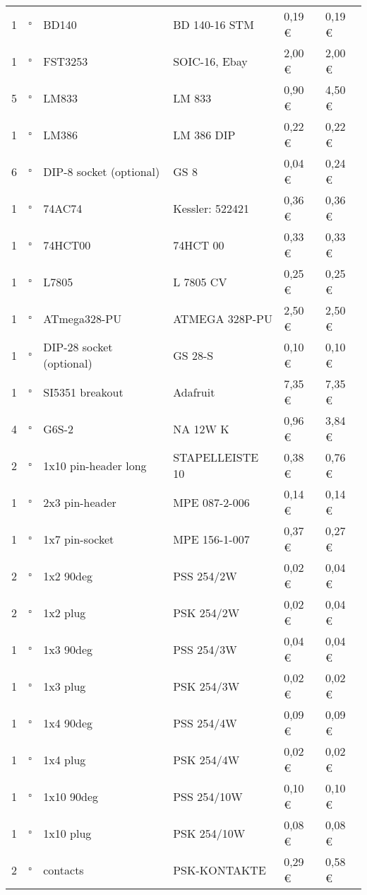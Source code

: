 \begin{longtable}{|p{}|p{}|p{}|p{}|p{}|p{}|}
1 & $\square$ & BD140 & BD 140-16 STM & 0,19 \euro & 0,19 \euro \\
1 & $\square$ & FST3253 & SOIC-16, Ebay & 2,00 \euro & 2,00 \euro \\
5 & $\square$ & LM833 & LM 833 & 0,90 \euro & 4,50 \euro \\
1 & $\square$ & LM386 & LM 386 DIP & 0,22 \euro & 0,22 \euro \\
6 & $\square$ & DIP-8 socket (optional) & GS 8 & 0,04 \euro & 0,24 \euro \\
1 & $\square$ & 74AC74 & Kessler: 522421 & 0,36 \euro & 0,36 \euro \\
1 & $\square$ & 74HCT00 & 74HCT 00 & 0,33 \euro & 0,33 \euro \\
1 & $\square$ & L7805 & L 7805 CV & 0,25 \euro & 0,25 \euro \\
1 & $\square$ & ATmega328-PU & ATMEGA 328P-PU & 2,50 \euro & 2,50 \euro \\
1 & $\square$ & DIP-28 socket (optional) & GS 28-S & 0,10 \euro & 0,10 \euro \\
1 & $\square$ & SI5351 breakout & Adafruit & 7,35 \euro & 7,35 \euro \\ \hline
4 & $\square$ & G6S-2 & NA 12W K & 0,96 \euro & 3,84 \euro \\ \hline
2 & $\square$ & 1x10 pin-header long & STAPELLEISTE 10 & 0,38 \euro & 0,76 \euro \\
1 & $\square$ & 2x3 pin-header & MPE 087-2-006 & 0,14 \euro & 0,14 \euro \\
1 & $\square$ & 1x7 pin-socket & MPE 156-1-007 & 0,37 \euro & 0,27 \euro \\
2 & $\square$ & 1x2 90deg & PSS 254/2W & 0,02 \euro & 0,04 \euro \\
2 & $\square$ & 1x2 plug & PSK 254/2W & 0,02 \euro & 0,04 \euro \\
1 & $\square$ & 1x3 90deg & PSS 254/3W & 0,04 \euro & 0,04 \euro \\
1 & $\square$ & 1x3 plug & PSK 254/3W & 0,02 \euro & 0,02 \euro \\
1 & $\square$ & 1x4 90deg & PSS 254/4W & 0,09 \euro & 0,09 \euro \\
1 & $\square$ & 1x4 plug & PSK 254/4W & 0,02 \euro & 0,02 \euro \\
1 & $\square$ & 1x10 90deg & PSS 254/10W & 0,10 \euro & 0,10 \euro \\
1 & $\square$ & 1x10 plug & PSK 254/10W & 0,08 \euro & 0,08 \euro \\
2 & $\square$ & contacts & PSK-KONTAKTE & 0,29 \euro & 0,58 \euro \\

\end{longtable}
